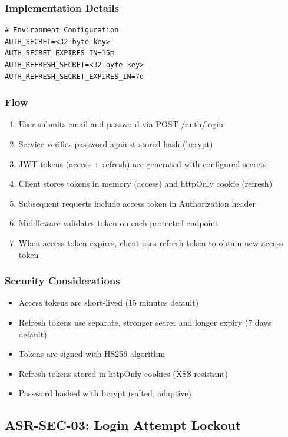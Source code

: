 \documentclass[12pt,oneside,a4paper]{article}
\begin{document}
\subsubsection{Implementation Details}
\begin{lstlisting}
# Environment Configuration
AUTH_SECRET=<32-byte-key>
AUTH_SECRET_EXPIRES_IN=15m
AUTH_REFRESH_SECRET=<32-byte-key>
AUTH_REFRESH_SECRET_EXPIRES_IN=7d
\end{lstlisting}

\subsubsection{Flow}
\begin{enumerate}
    \item User submits email and password via POST /auth/login
    \item Service verifies password against stored hash (bcrypt)
    \item JWT tokens (access + refresh) are generated with configured secrets
    \item Client stores tokens in memory (access) and httpOnly cookie (refresh)
    \item Subsequent requests include access token in Authorization header
    \item Middleware validates token on each protected endpoint
    \item When access token expires, client uses refresh token to obtain new access token
\end{enumerate}

\subsubsection{Security Considerations}
\begin{itemize}
    \item Access tokens are short-lived (15 minutes default)
    \item Refresh tokens use separate, stronger secret and longer expiry (7 days default)
    \item Tokens are signed with HS256 algorithm
    \item Refresh tokens stored in httpOnly cookies (XSS resistant)
    \item Password hashed with bcrypt (salted, adaptive)
\end{itemize}

\subsection{ASR-SEC-03: Login Attempt Lockout}
\end{document}
